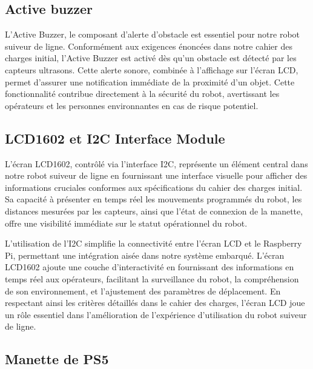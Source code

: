 \subsection{Active buzzer}
L'Active Buzzer, le composant d'alerte d'obstacle est essentiel pour notre robot suiveur de ligne. Conformément aux exigences énoncées dans notre cahier des charges initial, l'Active Buzzer est activé dès qu'un obstacle est détecté par les capteurs ultrasons. Cette alerte sonore, combinée à l'affichage sur l'écran LCD, permet d'assurer une notification immédiate de la proximité d'un objet. Cette fonctionnalité contribue directement à la sécurité du robot, avertissant les opérateurs et les personnes environnantes en cas de risque potentiel.

\subsection{LCD1602 et I2C Interface Module}
L'écran LCD1602, contrôlé via l'interface I2C, représente un élément central dans notre robot suiveur de ligne en fournissant une interface visuelle pour afficher des informations cruciales conformes aux spécifications du cahier des charges initial. Sa capacité à présenter en temps réel les mouvements programmés du robot, les distances mesurées par les capteurs, ainsi que l'état de connexion de la manette, offre une visibilité immédiate sur le statut opérationnel du robot.

L'utilisation de l'I2C simplifie la connectivité entre l'écran LCD et le Raspberry Pi, permettant une intégration aisée dans notre système embarqué. L'écran LCD1602 ajoute une couche d'interactivité en fournissant des informations en temps réel aux opérateurs, facilitant la surveillance du robot, la compréhension de son environnement, et l'ajustement des paramètres de déplacement. En respectant ainsi les critères détaillés dans le cahier des charges, l'écran LCD joue un rôle essentiel dans l'amélioration de l'expérience d'utilisation du robot suiveur de ligne.

\subsection{Manette de PS5}

\newpage